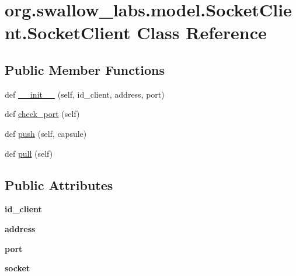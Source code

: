 \hypertarget{classorg_1_1swallow__labs_1_1model_1_1_socket_client_1_1_socket_client}{}\section{org.\+swallow\+\_\+labs.\+model.\+Socket\+Client.\+Socket\+Client Class Reference}
\label{classorg_1_1swallow__labs_1_1model_1_1_socket_client_1_1_socket_client}
\subsection*{Public Member Functions}
\begin{DoxyCompactItemize}
\item 
def \hyperlink{classorg_1_1swallow__labs_1_1model_1_1_socket_client_1_1_socket_client_a93c4e3fa3ba99d54ba6aeb4fcc0ed428}{\+\_\+\+\_\+init\+\_\+\+\_\+} (self, id\+\_\+client, address, port)
\item 
def \hyperlink{classorg_1_1swallow__labs_1_1model_1_1_socket_client_1_1_socket_client_a21bd0234ae774f05382d4d3453901bb8}{check\+\_\+port} (self)
\item 
def \hyperlink{classorg_1_1swallow__labs_1_1model_1_1_socket_client_1_1_socket_client_acae8c7c1b45d7a872c81483d338c5547}{push} (self, capsule)
\item 
def \hyperlink{classorg_1_1swallow__labs_1_1model_1_1_socket_client_1_1_socket_client_a537cb3609071c02e9f1114fc6f57105e}{pull} (self)
\end{DoxyCompactItemize}
\subsection*{Public Attributes}
\begin{DoxyCompactItemize}
\item 
\hypertarget{classorg_1_1swallow__labs_1_1model_1_1_socket_client_1_1_socket_client_a259852110cb3e5dbf4aeb353806bf09e}{}{\bfseries id\+\_\+client}\label{classorg_1_1swallow__labs_1_1model_1_1_socket_client_1_1_socket_client_a259852110cb3e5dbf4aeb353806bf09e}

\item 
\hypertarget{classorg_1_1swallow__labs_1_1model_1_1_socket_client_1_1_socket_client_af1d5ea9c128d59a3d92678fdd44a8bce}{}{\bfseries address}\label{classorg_1_1swallow__labs_1_1model_1_1_socket_client_1_1_socket_client_af1d5ea9c128d59a3d92678fdd44a8bce}

\item 
\hypertarget{classorg_1_1swallow__labs_1_1model_1_1_socket_client_1_1_socket_client_a4623d6e991ae9f63c1829e0929dc709c}{}{\bfseries port}\label{classorg_1_1swallow__labs_1_1model_1_1_socket_client_1_1_socket_client_a4623d6e991ae9f63c1829e0929dc709c}

\item 
\hypertarget{classorg_1_1swallow__labs_1_1model_1_1_socket_client_1_1_socket_client_aeab713d38e3db149b7d037bec30a3c43}{}{\bfseries socket}\label{classorg_1_1swallow__labs_1_1model_1_1_socket_client_1_1_socket_client_aeab713d38e3db149b7d037bec30a3c43}

\end{DoxyCompactItemize}
